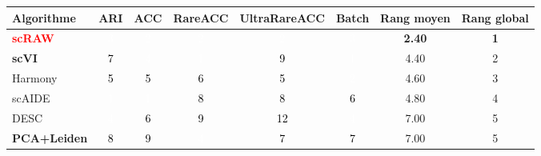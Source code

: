 
\begin{table}[!htbp]
\centering
\scriptsize
\renewcommand{\arraystretch}{1.25}
\setlength{\tabcolsep}{4pt}
\begin{tabular}{l ccccc c c}
\toprule
\textbf{Algorithme} & \textbf{ARI} & \textbf{ACC} & \textbf{RareACC} & \textbf{UltraRareACC} & \textbf{Batch} & \textbf{Rang moyen} & \textbf{Rang global} \\
\midrule
\textcolor{red}{\textbf{scRAW}} & \cellcolor{rankcol3}\textcolor{white}{3} & \cellcolor{rankcol2}\textcolor{white}{2} & \cellcolor{rankcol2}\textcolor{white}{2} & \cellcolor{rankcol2}\textcolor{white}{2} & \cellcolor{rankcol3}\textcolor{white}{3} & \textbf{2.40} & \textbf{1} \\
\textbf{scVI} & \cellcolor{rankcol7}\textcolor{black}{7} & \cellcolor{rankcol4}\textcolor{white}{4} & \cellcolor{rankcol1}\textcolor{white}{1} & \cellcolor{rankcol9}\textcolor{black}{9} & \cellcolor{rankcol1}\textcolor{white}{1} & 4.40 & 2 \\
Harmony & \cellcolor{rankcol5}\textcolor{black}{5} & \cellcolor{rankcol5}\textcolor{black}{5} & \cellcolor{rankcol6}\textcolor{black}{6} & \cellcolor{rankcol5}\textcolor{black}{5} & \cellcolor{rankcol2}\textcolor{white}{2} & 4.60 & 3 \\
scAIDE & \cellcolor{rankcol1}\textcolor{white}{1} & \cellcolor{rankcol1}\textcolor{white}{1} & \cellcolor{rankcol8}\textcolor{black}{8} & \cellcolor{rankcol8}\textcolor{black}{8} & \cellcolor{rankcol6}\textcolor{black}{6} & 4.80 & 4 \\
DESC & \cellcolor{rankcol4}\textcolor{white}{4} & \cellcolor{rankcol6}\textcolor{black}{6} & \cellcolor{rankcol9}\textcolor{black}{9} & \cellcolor{rankcol12}\textcolor{black}{12} & \cellcolor{rankcol4}\textcolor{white}{4} & 7.00 & 5 \\
\textbf{PCA+Leiden} & \cellcolor{rankcol8}\textcolor{black}{8} & \cellcolor{rankcol9}\textcolor{black}{9} & \cellcolor{rankcol4}\textcolor{white}{4} & \cellcolor{rankcol7}\textcolor{black}{7} & \cellcolor{rankcol7}\textcolor{black}{7} & 7.00 & 5 \\

\end{tabular}
\end{table}
